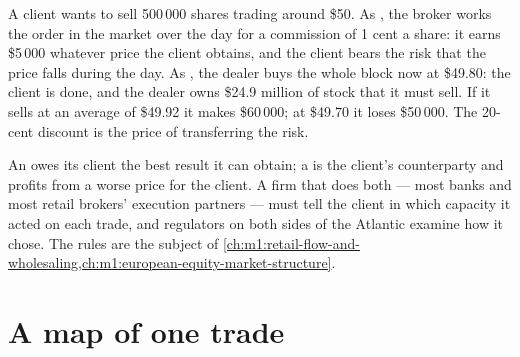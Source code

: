 \begin{example}\label{ex:m1:what-a-trading-firm-does:twice}
A client wants to sell 500\,000 shares trading around \$50. As
\emph{}, the broker works the order in the market over the day for a
commission of 1 cent a share: it earns \$5\,000 whatever price the client
obtains, and the client bears the risk that the price falls during the day.
As \emph{}, the dealer buys the whole block now at \$49.80: the
client is done, and the dealer owns \$24.9 million of stock that it must
sell. If it sells at an average of \$49.92 it makes \$60\,000; at \$49.70 it
loses \$50\,000. The 20-cent discount is the price of transferring the risk.
\end{example}

\begin{remark}\label{rem:m1:what-a-trading-firm-does:conflict}
An  owes its client the best result it can obtain; a  is the
client's counterparty and profits from a worse price for the client. A firm
that does both --- most banks and most retail brokers' execution partners ---
must tell the client in which capacity it acted on each trade, and regulators
on both sides of the Atlantic examine how it chose. The rules are the subject
of \cref{ch:m1:retail-flow-and-wholesaling,ch:m1:european-equity-market-structure}.
\end{remark}

\section{A map of one trade}

